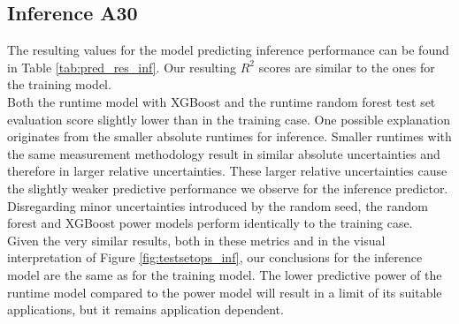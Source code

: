 \subsection{Inference A30}

The resulting values for the model predicting inference performance can be found in Table \ref{tab:pred_res_inf}. Our resulting $R^2$ scores are similar to the ones for the training model. \\
Both the runtime model with XGBoost and the runtime random forest test set evaluation score slightly lower than in the training case. One possible explanation originates from the smaller absolute runtimes for inference. Smaller runtimes with the same measurement methodology result in similar absolute uncertainties and therefore in larger relative uncertainties. These larger relative uncertainties cause the slightly weaker predictive performance we observe for the inference predictor.\\
Disregarding minor uncertainties introduced by the random seed, the random forest and XGBoost power models perform identically to the training case. \\
Given the very similar results, both in these metrics and in the visual interpretation of Figure \ref{fig:testsetops_inf}, our conclusions for the inference model are the same as for the training model. The lower predictive power of the runtime model compared to the power model will result in a limit of its suitable applications, but it remains application dependent. 







